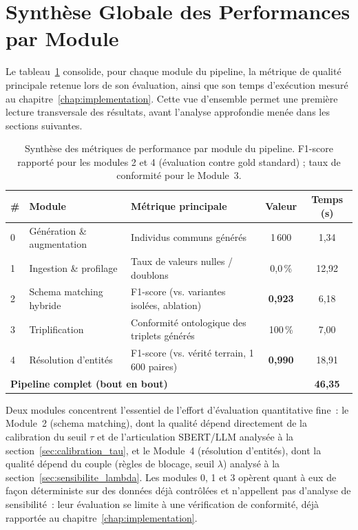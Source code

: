 \section{Synthèse Globale des Performances par Module}
\label{sec:synthese_globale}

Le tableau~\ref{tab:synthese_globale} consolide, pour chaque module du
pipeline, la métrique de qualité principale retenue lors de son
évaluation, ainsi que son temps d'exécution mesuré au
chapitre~\ref{chap:implementation}. Cette vue d'ensemble permet une
première lecture transversale des résultats, avant l'analyse approfondie
menée dans les sections suivantes.

\begin{table}[h]
\centering
\caption{Synthèse des métriques de performance par module du pipeline.
         F1-score rapporté pour les modules 2 et 4 (évaluation contre
         gold standard) ; taux de conformité pour le Module~3.}
\label{tab:synthese_globale}
\begin{tabular}{p{0.6cm}p{4.2cm}p{4.6cm}cc}
\hline
\textbf{\#} & \textbf{Module} & \textbf{Métrique principale}
  & \textbf{Valeur} & \textbf{Temps (s)} \\
\hline
0 & Génération \& augmentation & Individus communs générés
  & 1\,600 & 1,34 \\
1 & Ingestion \& profilage & Taux de valeurs nulles / doublons
  & 0,0\,\% & 12,92 \\
2 & Schema matching hybride & F1-score (vs. variantes isolées, ablation)
  & \textbf{0,923} & 6,18 \\
3 & Triplification & Conformité ontologique des triplets générés
  & 100\,\% & 7,00 \\
4 & Résolution d'entités & F1-score (vs. vérité terrain, 1\,600 paires)
  & \textbf{0,990} & 18,91 \\
\hline
\multicolumn{4}{l}{\textbf{Pipeline complet (bout en bout)}} & \textbf{46,35} \\
\hline
\end{tabular}
\end{table}

\noindent Deux modules concentrent l'essentiel de l'effort d'évaluation
quantitative fine~: le Module~2 (schema matching), dont la qualité
dépend directement de la calibration du seuil $\tau$ et de l'articulation
SBERT/LLM analysée à la section~\ref{sec:calibration_tau}, et le
Module~4 (résolution d'entités), dont la qualité dépend du couple
(règles de blocage, seuil $\lambda$) analysé à la
section~\ref{sec:sensibilite_lambda}. Les modules 0, 1 et 3 opèrent quant
à eux de façon déterministe sur des données déjà contrôlées et
n'appellent pas d'analyse de sensibilité~: leur évaluation se limite à
une vérification de conformité, déjà rapportée au
chapitre~\ref{chap:implementation}.

